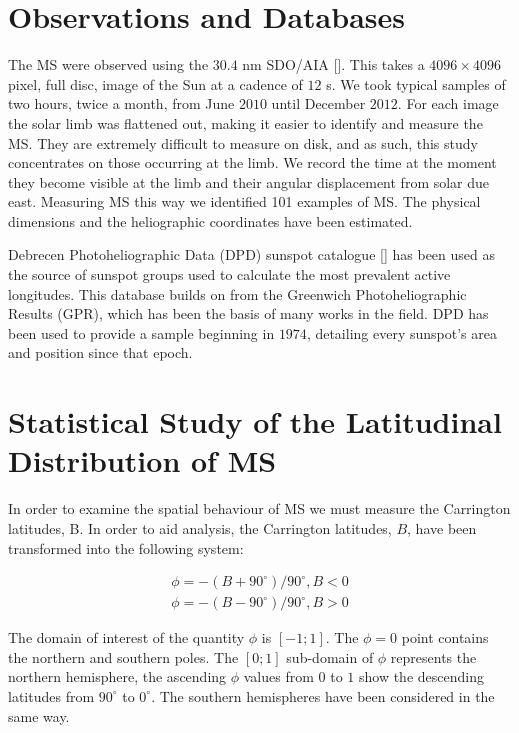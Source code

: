 \section{Observations and Databases}
The MS were observed using the $30.4$ nm SDO/AIA [\cite{AIAspec}]. 
This takes a $4096 \times 4096$ pixel, full disc, image of the Sun at a cadence of $12$ s. 
We took typical samples of two hours, twice a month, from June $2010$ until December $2012$.
For each image the solar limb was flattened out, making it easier to identify and measure the MS.
They are extremely difficult to measure on disk, and as such, this study concentrates on those occurring at the limb.
We record the time at the moment they become visible at the limb and their angular displacement from solar due east.
Measuring MS this way we identified 101 examples of MS. The physical dimensions and the heliographic coordinates have been estimated. 

Debrecen Photoheliographic Data (DPD) sunspot catalogue [\cite{Gyori2011}] has been used as the source of sunspot groups used to calculate the most prevalent active longitudes.
This database builds on from the Greenwich Photoheliographic Results (GPR), which has been the basis of many works in the field.
DPD has been used to provide a sample beginning in $1974$, detailing every sunspot's area and position since that epoch.

\section{Statistical Study of the Latitudinal Distribution of MS}
In order to examine the spatial behaviour of MS we must measure the Carrington latitudes, B.
In order to aid analysis, the Carrington latitudes, $B$, have been transformed into the following system:

\begin{equation}
\begin{split}
\phi=-(B+90^{\circ})/90^{\circ},  B<0 \\
\phi=-(B-90^{\circ})/90^{\circ},  B>0
\end{split}
\end{equation}

The domain of interest of the quantity $\phi$ is $[-1;1]$. 
The $\phi=0$ point contains the northern and southern poles.
The $[0;1]$ sub-domain of $\phi$ represents the northern hemisphere, the ascending $\phi$ values from $0$ to $1$ show the descending latitudes from $90^{\circ}$ to $0^{\circ}$. 
The southern hemispheres have been considered in the same way.


